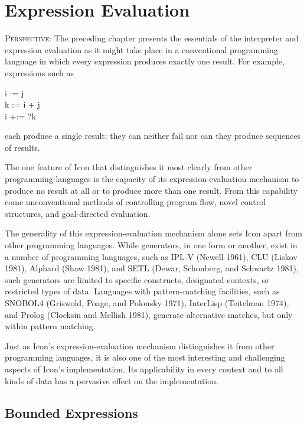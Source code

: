 \chapter{Expression Evaluation}
\label{EV-Chapter}

\textsc{Perspective}: The preceding chapter presents the essentials of
the interpreter and expression evaluation as it might take place in a
conventional programming language in which every expression produces
exactly one result. For example, expressions such as

\begin{iconcode}
\>i := j \\
\>k := i + j\\
\>i +:= ?k
\end{iconcode}

\noindent each produce a single result: they can neither fail nor can
they produce sequences of results.

The one feature of Icon that distinguishes it most clearly from other
programming languages is the capacity of its expression-evaluation
mechanism to produce no result at all or to produce more than one
result. From this capability come unconventional methods of
controlling program flow, novel control structures, and goal-directed
evaluation.

The generality of this expression-evaluation mechanism alone sets Icon
apart from other programming languages. While generators, in one form
or another, exist in a number of programming languages, such as IPL-V
(Newell 1961), CLU (Liskov 1981), Alphard (Shaw 1981), and SETL
(Dewar, Schonberg, and Schwartz 1981), such generators are limited to
specific constructs, designated contexts, or restricted types of
data. Languages with pattern-matching facilities, such as SNOBOL4
(Griswold, Poage, and Polonsky 1971), InterLisp (Teitelman 1974), and
Prolog (Clocksin and Mellish 1981), generate alternative matches, but
only within pattern matching.

Just as Icon's expression-evaluation mechanism distinguishes it from
other programming languages, it is also one of the most interesting
and challenging aspects of Icon's implementation. Its applicability in
every context and to all kinds of data has a pervasive effect on the
implementation.


\section{Bounded Expressions}

